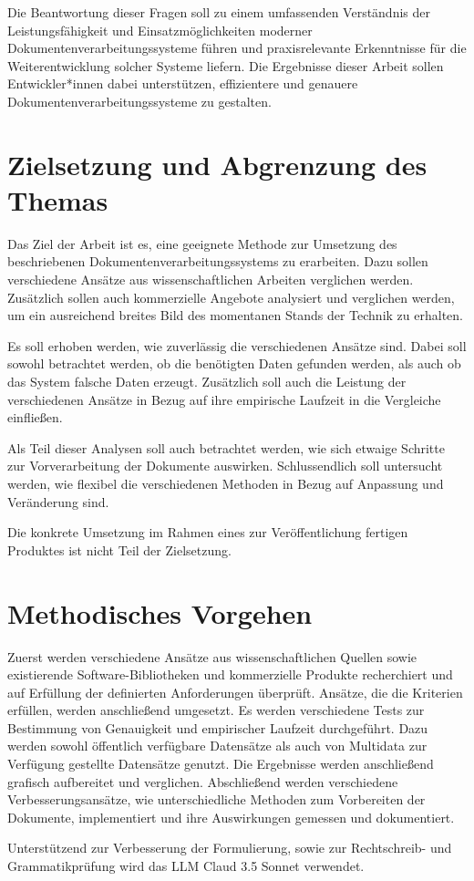 Die Beantwortung dieser Fragen soll zu einem umfassenden Verständnis der Leistungsfähigkeit und Einsatzmöglichkeiten moderner Dokumentenverarbeitungssysteme führen und praxisrelevante Erkenntnisse für die Weiterentwicklung solcher Systeme liefern. Die Ergebnisse dieser Arbeit sollen Entwickler*innen dabei unterstützen, effizientere und genauere Dokumentenverarbeitungssysteme zu gestalten.

\section{Zielsetzung und Abgrenzung des Themas}
\label{sec:zielsetzung-und-abgrenzung}

Das Ziel der Arbeit ist es, eine geeignete Methode zur Umsetzung des beschriebenen Dokumentenverarbeitungssystems zu erarbeiten. Dazu sollen verschiedene Ansätze aus wissenschaftlichen Arbeiten verglichen werden. Zusätzlich sollen auch kommerzielle Angebote analysiert und verglichen werden, um ein ausreichend breites Bild des momentanen Stands der Technik zu erhalten.

Es soll erhoben werden, wie zuverlässig die verschiedenen Ansätze sind. Dabei soll sowohl betrachtet werden, ob die benötigten Daten gefunden werden, als auch ob das System falsche Daten erzeugt. Zusätzlich soll auch die Leistung der verschiedenen Ansätze in Bezug auf ihre empirische Laufzeit in die Vergleiche einfließen.

Als Teil dieser Analysen soll auch betrachtet werden, wie sich etwaige Schritte zur Vorverarbeitung der Dokumente auswirken. Schlussendlich soll untersucht werden, wie flexibel die verschiedenen Methoden in Bezug auf Anpassung und Veränderung sind.

Die konkrete Umsetzung im Rahmen eines zur Veröffentlichung fertigen Produktes ist nicht Teil der Zielsetzung.

\section{Methodisches Vorgehen}
\label{sec:methodisches-vorgehen}

Zuerst werden verschiedene Ansätze aus wissenschaftlichen Quellen sowie existierende Software-Bibliotheken und kommerzielle Produkte recherchiert und auf Erfüllung der definierten Anforderungen überprüft. Ansätze, die die Kriterien erfüllen, werden anschließend umgesetzt. Es werden verschiedene Tests zur Bestimmung von Genauigkeit und empirischer Laufzeit durchgeführt. Dazu werden sowohl öffentlich verfügbare Datensätze als auch von Multidata zur Verfügung gestellte Datensätze genutzt. Die Ergebnisse werden anschließend grafisch aufbereitet und verglichen. Abschließend werden verschiedene Verbesserungsansätze, wie unterschiedliche Methoden zum Vorbereiten der Dokumente, implementiert und ihre Auswirkungen gemessen und dokumentiert.

Unterstützend zur Verbesserung der Formulierung, sowie zur Rechtschreib- und Grammatikprüfung wird das \gls{LLM} Claud 3.5 Sonnet \parencite{anthropic_claude} verwendet.